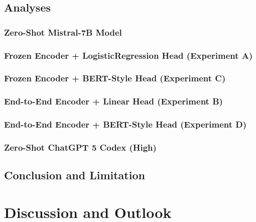\documentclass[12pt]{article}
\begin{document}
\subsection{Analyses}
\subsubsection{Zero-Shot Mistral-7B Model}
\subsubsection{Frozen Encoder + LogisticRegression Head (Experiment A)}
\subsubsection{Frozen Encoder + BERT-Style Head (Experiment C)}
\subsubsection{End-to-End Encoder + Linear Head (Experiment B)}
\subsubsection{End-to-End Encoder + BERT-Style Head (Experiment D)}
\subsubsection{Zero-Shot ChatGPT 5 Codex (High)}


\subsection{Conclusion and Limitation}

\section{Discussion and Outlook}

\end{document}
